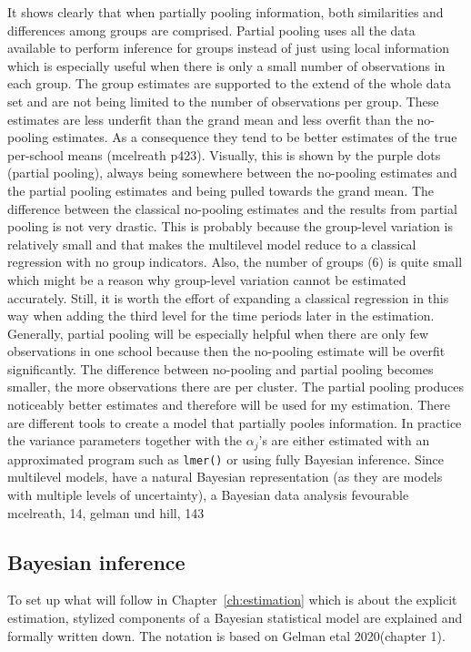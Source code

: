 \documentclass[a4, 12pt]{article}
\begin{document}
It shows clearly that when partially pooling information, both similarities and differences among groups are comprised. Partial pooling uses all the data available to perform inference for groups instead of just using local information which is especially useful when there is only a small number of observations in each group. The group estimates are supported to the extend of the whole data set and are not being limited to the number of observations per group. These estimates are less underfit than the grand mean and less overfit than the no-pooling estimates. As a consequence they tend to be better estimates of the true per-school means (mcelreath p423). Visually, this is shown by the purple dots (partial pooling), always being somewhere between the no-pooling estimates and the partial pooling estimates and being pulled towards the grand mean. The difference between the classical no-pooling estimates and the results from partial pooling is not very drastic. This is probably because the group-level variation is relatively small and that makes the multilevel model reduce to a classical regression with no group indicators. Also, the number of groups (6) is quite small which might be a reason why group-level variation cannot be estimated accurately. Still, it is worth the effort of expanding a classical regression in this way when adding the third level for the time periods later in the estimation. Generally, partial pooling will be especially helpful when there are only few observations in one school because then the no-pooling estimate will be overfit significantly. The difference between no-pooling and partial pooling becomes smaller, the more observations there are per cluster. The partial pooling produces noticeably better estimates and therefore will be used for my estimation. There are different tools to create a model that partially pooles information. In practice the variance parameters together with the \(\alpha_j\)'s are either estimated with an approximated program such as \texttt{lmer()} or using fully Bayesian inference. Since multilevel models, have a natural Bayesian representation (as they are models with multiple levels of uncertainty), a Bayesian data analysis fevourable mcelreath, 14, gelman und hill, 143

\hypertarget{bayesian-inference}{%
\subsection{Bayesian inference}\label{bayesian-inference}}

To set up what will follow in Chapter~\ref{ch:estimation} which is about the explicit estimation, stylized components of a Bayesian statistical model are explained and formally written down. The notation is based on Gelman etal 2020(chapter 1).
\end{document}
